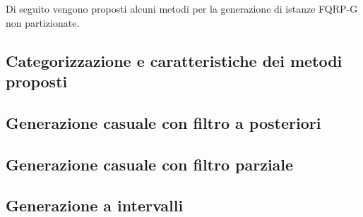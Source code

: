 \documentclass[../main.tex]{subfiles}
\begin{document}
Di seguito vengono proposti alcuni metodi per la generazione di istanze FQRP-G non partizionate.

\subsection{Categorizzazione e caratteristiche dei metodi proposti}


\subsection{Generazione casuale con filtro a posteriori}


\subsection{Generazione casuale con filtro parziale}


\subsection{Generazione a intervalli}

\end{document}

